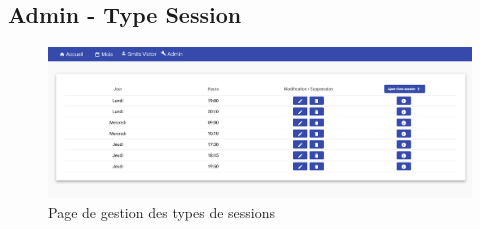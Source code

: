 	
	\newpage
	\subsection{Admin - Type Session}
		\begin{figure}[h!]
       	 	\includegraphics[width=0.8\linewidth, center]{Mockup/Admin-Type-Session.png}
       	 	\caption{Page de gestion des types de sessions}
       	\end{figure}

